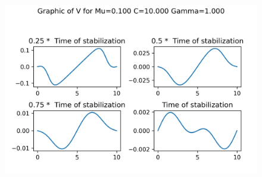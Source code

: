 \begin{figure}[H]
	\includegraphics[scale=0.5]{../graphs_data_nonsmooth_1/slices/Graph_V_mu0.100_C10.000_gamma1.000.png}
\end{figure}

